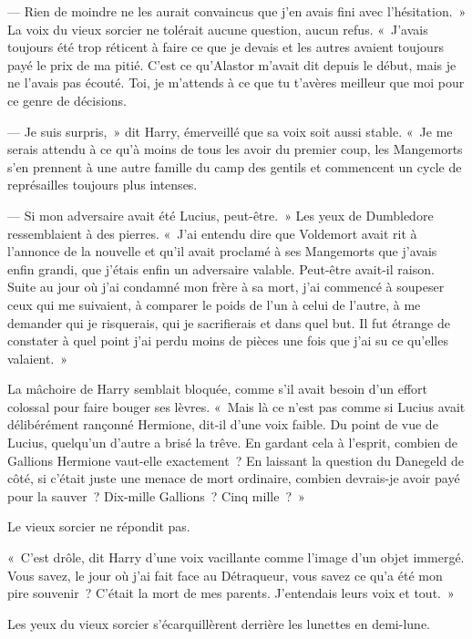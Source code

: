 --- Rien de moindre ne les aurait convaincus que j'en avais fini avec l'hésitation.~» La voix du vieux sorcier ne tolérait aucune question, aucun refus. «~J'avais toujours été trop réticent à faire ce que je devais et les autres avaient toujours payé le prix de ma pitié. C'est ce qu'Alastor m'avait dit depuis le début, mais je ne l'avais pas écouté. Toi, je m'attends à ce que tu t'avères meilleur que moi pour ce genre de décisions.

--- Je suis surpris,~» dit Harry, émerveillé que sa voix soit aussi stable. «~Je me serais attendu à ce qu'à moins de tous les avoir du premier coup, les Mangemorts s'en prennent à une autre famille du camp des gentils et commencent un cycle de représailles toujours plus intenses.

--- Si mon adversaire avait été Lucius, peut-être.~» Les yeux de Dumbledore ressemblaient à des pierres. «~J'ai entendu dire que Voldemort avait rit à l'annonce de la nouvelle et qu'il avait proclamé à ses Mangemorts que j'avais enfin grandi, que j'étais enfin un adversaire valable. Peut-être avait-il raison. Suite au jour où j'ai condamné mon frère à sa mort, j'ai commencé à soupeser ceux qui me suivaient, à comparer le poids de l'un à celui de l'autre, à me demander qui je risquerais, qui je sacrifierais et dans quel but. Il fut étrange de constater à quel point j'ai perdu moins de pièces une fois que j'ai su ce qu'elles valaient.~»

La mâchoire de Harry semblait bloquée, comme s'il avait besoin d'un effort colossal pour faire bouger ses lèvres. «~Mais là ce n'est pas comme si Lucius avait délibérément rançonné Hermione, dit-il d'une voix faible. Du point de vue de Lucius, quelqu'un d'autre a brisé la trêve. En gardant cela à l'esprit, combien de Gallions Hermione vaut-elle exactement~? En laissant la question du Danegeld de côté, si c'était juste une menace de mort ordinaire, combien devrais-je avoir payé pour la sauver~? Dix-mille Gallions~? Cinq mille~?~»

Le vieux sorcier ne répondit pas.

«~C'est drôle, dit Harry d'une voix vacillante comme l'image d'un objet immergé. Vous savez, le jour où j'ai fait face au Détraqueur, vous savez ce qu'a été mon pire souvenir~? C'était la mort de mes parents. J'entendais leurs voix et tout.~»

Les yeux du vieux sorcier s'écarquillèrent derrière les lunettes en demi-lune.

